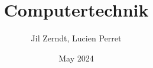 \documentclass[a4paper, fontsize = 8pt, landscape]{scrartcl}
\title{Computertechnik}
\author{Jil Zerndt, Lucien Perret}
\date{May 2024}
\begin{document}
\begin{multicols}{3}
	\thispagestyle{TitlePageStyle}
	\maketitle

	
	\raggedcolumns
	
	\raggedcolumns
	
	\raggedcolumns
	
	
	
	
	
	
	
	
	\raggedcolumns
	\pagebreak
	
\end{multicols}
\end{document}
